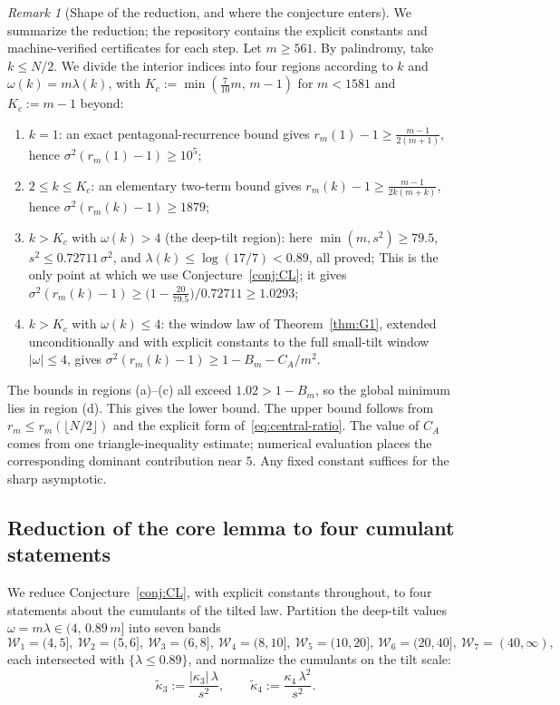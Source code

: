 \documentclass[11pt]{amsart}
\theoremstyle{plain}
\theoremstyle{definition}
\theoremstyle{remark}
\newtheorem{remark}[theorem]{Remark}
\begin{document}
\begin{remark}[Shape of the reduction, and where the conjecture enters]
\label{rem:reduction}
We summarize the reduction; the repository contains the explicit constants
and machine-verified certificates for each step. Let $m\ge561$. By
palindromy, take $k\le N/2$. We divide the interior indices into four
regions according to $k$ and $\omega(k)=m\lambda(k)$, with
$K_c:=\min(\tfrac7{10}m,\,m-1)$ for $m<1581$ and $K_c:=m-1$ beyond:
\begin{enumerate}[label=(\alph*)]
\item $k=1$: an exact pentagonal-recurrence bound gives
$r_m(1)-1\ge\tfrac{m-1}{2(m+1)}$, hence $\sigma^2(r_m(1)-1)\ge10^5$;
\item $2\le k\le K_c$: an elementary two-term bound gives
$r_m(k)-1\ge\tfrac{m-1}{2k(m+k)}$, hence $\sigma^2(r_m(k)-1)\ge1879$;
\item $k>K_c$ with $\omega(k)>4$ (the deep-tilt region): here
$\min(m,s^2)\ge79.5$, $s^2\le0.72711\,\sigma^2$, and
$\lambda(k)\le\log(17/7)<0.89$, all proved; This is the only point at which we use
Conjecture~\ref{conj:CL}; it gives
$\sigma^2(r_m(k)-1)\ge\bigl(1-\tfrac{20}{79.5}\bigr)/0.72711\ge1.0293$;
\item $k>K_c$ with $\omega(k)\le4$: the window law of
Theorem~\ref{thm:G1}, extended unconditionally and with explicit
constants to the full small-tilt window $|\omega|\le4$, gives
$\sigma^2(r_m(k)-1)\ge1-B_m-C_A/m^2$.
\end{enumerate}
The bounds in regions (a)--(c) all exceed $1.02>1-B_m$, so the global
minimum lies in region (d). This gives the lower bound. The upper bound
follows from $r_m\le r_m(\lfloor N/2\rfloor)$ and the explicit form
of~\eqref{eq:central-ratio}. The value of $C_A$ comes from one
triangle-inequality estimate; numerical evaluation places the corresponding
dominant contribution near $5$. Any fixed constant suffices for the sharp
asymptotic.
\end{remark}

\subsection*{Reduction of the core lemma to four cumulant statements}
We reduce Conjecture~\ref{conj:CL}, with explicit constants throughout, to
four statements about the cumulants of the tilted law.
Partition the deep-tilt values $\omega=m\lambda\in(4,\,0.89\,m]$ into
seven bands
\[
\mathcal W_1=(4,5],\ \mathcal W_2=(5,6],\ \mathcal W_3=(6,8],\
\mathcal W_4=(8,10],\ \mathcal W_5=(10,20],\ \mathcal W_6=(20,40],\
\mathcal W_7=(40,\infty),
\]
each intersected with $\{\lambda\le0.89\}$, and normalize the cumulants
on the tilt scale:
\[
\tilde\kappa_3:=\frac{|\kappa_3|\,\lambda}{s^2},\qquad
\tilde\kappa_4:=\frac{\kappa_4\,\lambda^2}{s^2}.
\]
\end{document}
